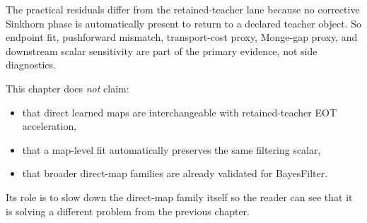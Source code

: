 The practical residuals differ from the retained-teacher lane because no
corrective Sinkhorn phase is automatically present to return to a declared
teacher object.  So endpoint fit, pushforward mismatch, transport-cost proxy,
Monge-gap proxy, and downstream scalar sensitivity are part of the primary
evidence, not side diagnostics.

This chapter does \emph{not} claim:
\begin{itemize}
  \item that direct learned maps are interchangeable with retained-teacher EOT
  acceleration,
  \item that a map-level fit automatically preserves the same filtering scalar,
  \item that broader direct-map families are already validated for BayesFilter.
\end{itemize}
Its role is to slow down the direct-map family itself so the reader can see that
it is solving a different problem from the previous chapter.

\FloatBarrier
